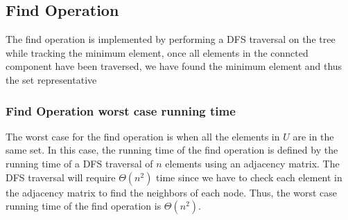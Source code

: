 \documentclass{article}
\begin{document}
\subsection*{Find Operation}
The find operation is implemented by performing a DFS traversal on the tree while tracking the minimum element, once all elements in the conncted component have been traversed, we have found the minimum element and thus the set representative
\subsubsection*{Find Operation worst case running time}
The worst case for the find operation is when all the elements in $U$ are in the same set. In this case, the running time of the find operation is defined by the running time of a DFS traversal of $n$ elements using an adjacency matrix. The DFS traversal will require $\Theta(n^2)$ time since we have to check each element in the adjacency matrix to find the neighbors of each node. Thus, the worst case running time of the find operation is $\Theta(n^2)$.
\end{document}
